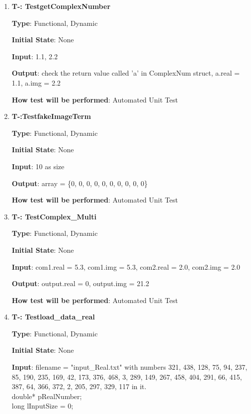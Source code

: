 \documentclass[12pt, titlepage]{article}
\newcounter{tnum}
\begin{document}
\begin{enumerate}

\item{\textbf{T-\thetnum \label{CNI}: TestgetComplexNumber}}

\textbf {Type}: Functional, Dynamic
					
\textbf {Initial State}: None
					
\textbf {Input}: 1.1, 2.2
					
\textbf {Output}: check the return value called 'a' in ComplexNum struct, a.real = 1.1, a.img = 2.2
					
\textbf {How test will be performed}: Automated Unit Test


\item{\textbf{T-\thetnum \label{FZ}:TestfakeImageTerm}}

\textbf {Type}: Functional, Dynamic
					
\textbf {Initial State}: None
					
\textbf {Input}: 10 as size 
					
\textbf {Output}: array = \{0, 0, 0, 0, 0, 0, 0, 0, 0, 0\}
					
\textbf {How test will be performed}:  Automated Unit Test


\item{\textbf{T-\thetnum \label{DTC}: TestComplex\_Multi}}

\textbf {Type}: Functional, Dynamic
					
\textbf {Initial State}: None
					
\textbf {Input}: com1.real = 5.3, com1.img = 5.3, com2.real = 2.0, com2.img = 2.0
					
\textbf {Output}: output.real = 0, output.img = 21.2
					
\textbf {How test will be performed}:  Automated Unit Test


\item{\textbf{T-\thetnum \label{CCC}: Testload\_data\_real}}

\textbf {Type}: Functional, Dynamic
					
\textbf {Initial State}: None
					
\textbf {Input}: filename = "input\_Real.txt"  with numbers 321, 438, 128, 75, 94, 237, 85, 190, 235, 169, 42, 
173, 376, 468, 3, 289, 149, 267, 458, 404, 291, 66, 415, 387, 64, 366, 372, 2, 205, 297, 329, 117  in it.\\
double* pRealNumber;\\
long lInputSize = 0;
					

\end{enumerate}
\end{document}
